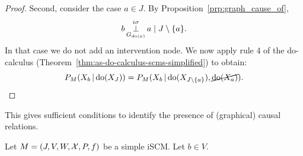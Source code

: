 {\begin{proof}
  Second, consider the case $a \in J$. 
  By Proposition~\ref{prp:graph_cause_of},
    $$b \operatorname*{\perp}^{i\sigma}_{G_{\operatorname{do}(a)}} a \mid J \setminus \{a\}.$$
  In that case we do not add an intervention node. 
  We now apply rule 4 of the do-calculus (Theorem~\ref{thm:as-do-calculus-scms-simplified}) to obtain:
    $$P_{M}(X_b \operatorname*{|} \operatorname{do}(X_J)) = P_{M}(X_b \operatorname*{|} \operatorname{do}(X_{J\setminus \{a\}}),\cancel{\operatorname{do}(X_a)}).$$


\end{proof}
This gives sufficient conditions to identify the presence of (graphical) causal relations.
%
\begin{Cor}\label{cor:scm_identify_graphical_causal_relation}
  Let $M = \left ( J, V, W, \mathcal{X}, P, f \right )$ be a simple iSCM.
  Let $b \in V$.


\end{Cor}}
